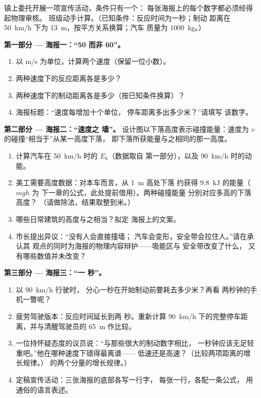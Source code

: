 \begin{problem}\label{pb:g9:kinetic-energy-safety:1}
镇上委托开展一项宣传活动，条件只有一个：
每张海报上的每个数字都必须经得起物理审核。
班级动手计算。（已知条件：反应时间为一秒；制动
距离在 \qty{50}{km/h} 下为 \qty{13}{m}，按平方关系换算；汽车
质量为 \qty{1000}{kg}。）

\medskip\noindent\textbf{第一部分 --- 海报一：“50 而非
60”。}
\begin{enumerate}
  \item 以 \unit{m/s} 为单位，计算两个速度（保留一位小数）。
  \item 两种速度下的反应距离各是多少？
  \item 两种速度下的制动距离各是多少（按已知条件换算）？
  \item 海报标题：“速度每增加十个单位，
        停车距离多出多少米？”请填写
        该数字。
\end{enumerate}

\medskip\noindent\textbf{第二部分 --- 海报二：“速度之
墙”。}
设计图以下落高度表示碰撞能量：速度为
$v$ 的碰撞“相当于”从某一高度下落，
即下落所获能量与之相同的那一高度。
\begin{enumerate}[resume]
  \item 计算汽车在 \qty{50}{km/h} 时的 $E_k$（数据取自
        第一部分），以及 \qty{90}{km/h} 时的动能。
  \item 美工需要高度数据：对本车而言，从 \qty{1}{m} 高处下落
        约获得 \qty{9.8}{kJ} 的能量（$m g h$ 为
        下一章的公式，此处提前借用）。两种碰撞能量
        分别对应多高的下落高度？
        （请做除法，结果取整到米。）
  \item 哪些日常建筑的高度与之相当？拟定
        海报上的文案。
  \item 市长提出异议：“没有人会直接撞墙；
        汽车会变形，安全带会拉住人。”请在承认其
        观点的同时为海报的物理内容辩护——吸能区与
        安全带改变了什么，
        又有哪些数值并未改变？
\end{enumerate}

\medskip\noindent\textbf{第三部分 --- 海报三：“一
秒”。}
\begin{enumerate}[resume]
  \item 以 \qty{90}{km/h} 行驶时，
        分心一秒在开始制动前要耗去多少米？再看
        两秒钟的手机一瞥呢？
  \item 疲劳驾驶版本：反应时间延长到两
        秒。重新计算
        \qty{90}{km/h} 下的完整停车距离，并与清醒驾驶员的
        \qty{65}{m} 作比较。
  \item 一位持怀疑态度的议员说：“与那些很大的制动数字相比，
        一秒钟应该无足轻重吧。”他在哪种速度下错得最离谱——
        低速还是高速？（比较两项距离的增长规律。）
        的两个分量的增长规律。）
  \item 定稿宣传活动：三张海报的底部各写一行字，
        每张一行，各配一条公式，
        用通俗的语言表述。
\end{enumerate}
\end{problem}
